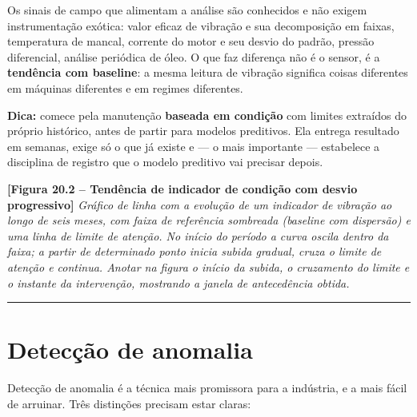 Os sinais de campo que alimentam a análise são conhecidos e não exigem instrumentação exótica: valor
eficaz de vibração e sua decomposição em faixas, temperatura de mancal, corrente do motor e seu
desvio do padrão, pressão diferencial, análise periódica de óleo. O que faz diferença não é o sensor,
é a \textbf{tendência com baseline}: a mesma leitura de vibração significa coisas diferentes em máquinas
diferentes e em regimes diferentes.

\begin{caixadica}

\textbf{Dica:} comece pela manutenção \textbf{baseada em condição} com limites extraídos do próprio
histórico, antes de partir para modelos preditivos. Ela entrega resultado em semanas, exige só o que
já existe e --- o mais importante --- estabelece a disciplina de registro que o modelo preditivo vai
precisar depois.

\end{caixadica}

\begin{caixafigura}

\textbf{{[}Figura 20.2 -- Tendência de indicador de condição com desvio progressivo{]}}
\emph{Gráfico de linha com a evolução de um indicador de vibração ao longo de seis meses, com faixa de referência sombreada (baseline com dispersão) e uma linha de limite de atenção. No início do período a curva oscila dentro da faixa; a partir de determinado ponto inicia subida gradual, cruza o limite de atenção e continua. Anotar na figura o início da subida, o cruzamento do limite e o instante da intervenção, mostrando a janela de antecedência obtida.}

\end{caixafigura}

\begin{center}\rule{0.5\linewidth}{0.5pt}\end{center}

\section{Detecção de anomalia}\label{detecuxe7uxe3o-de-anomalia}

Detecção de anomalia é a técnica mais promissora para a indústria, e a mais fácil de arruinar. Três
distinções precisam estar claras:


